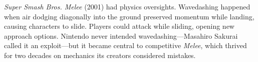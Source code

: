 \emph{Super Smash Bros. Melee} (2001) had physics oversights. Wavedashing happened when air dodging diagonally into the ground preserved momentum while landing, causing characters to slide. Players could attack while sliding, opening new approach options. Nintendo never intended wavedashing—Masahiro Sakurai called it an exploit—but it became central to competitive \emph{Melee}, which thrived for two decades on mechanics its creators considered mistakes.

